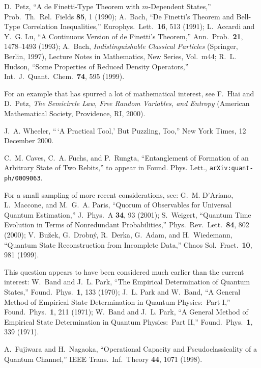 \begin{thebibliography}{10}
D.~Petz, ``A de Finetti-Type Theorem with $m$-Dependent States,''
Prob.\ Th.\ Rel.\ Fields {\bf 85}, 1 (1990); A.~Bach, ``De Finetti's
Theorem and Bell-Type Correlation Inequalities,'' Europhys.\ Lett.\
{\bf 16}, 513 (1991); L.~Accardi and Y.~G. Lu, ``A Continuous Version
of de Finetti's Theorem,'' Ann.\ Prob.\ {\bf 21}, 1478--1493 (1993);
A.~Bach, {\sl Indistinguishable Classical Particles\/} (Springer,
Berlin, 1997), Lecture Notes in Mathematics, New Series, Vol.\ m44;
R.~L. Hudson, ``Some Properties of Reduced Density Operators,'' Int.\
J.\ Quant.\ Chem.\ {\bf 74}, 595 (1999).

For an example that has spurred a lot of mathematical interest, see
F.~Hiai and D.~Petz, {\sl The Semicircle Law, Free Random Variables,
and Entropy\/} (American Mathematical Society, Providence, RI, 2000).

\bibitem{Wheeler2000}
J.~A. Wheeler, ``\,`A Practical Tool,' But Puzzling, Too,'' New York
Times, 12 December 2000.

C.~M. Caves, C.~A. Fuchs, and P.~Rungta, ``Entanglement of Formation
of an Arbitrary State of Two Rebits,'' to appear in Found. Phys. Lett.,
{\tt arXiv:quant-ph/0009063}.

For a small sampling of more recent considerations, see: G.~M.
D'Ariano, L.~Maccone, and M.~G.~A. Paris, ``Quorum of Observables for
Universal Quantum Estimation,'' J.\ Phys.\ A {\bf 34}, 93 (2001);
S.~Weigert, ``Quantum Time Evolution in Terms of Nonredundant
Probabilities,'' Phys.\ Rev.\ Lett.\ {\bf 84}, 802 (2000);
V.~Bu\v{z}ek, G.~Drobn\'y, R.~Derka, G.~Adam, and H.~Wiedemann,
``Quantum State Reconstruction from Incomplete Data,'' Chaos Sol.\
Fract.\ {\bf 10}, 981 (1999).

\bibitem{QuorumOld}
This question appears to have been considered much earlier than
the current interest: W.~Band and J.~L. Park, ``The Empirical
Determination of Quantum States,'' Found.\ Phys.\ {\bf 1}, 133
(1970); J.~L. Park and W.~Band, ``A General Method of Empirical
State Determination in Quantum Physics:\ Part I,'' Found.\ Phys.\
{\bf 1}, 211 (1971); W.~Band and J.~L. Park, ``A General Method of
Empirical State Determination in Quantum Physics:\ Part II,''
Found.\ Phys.\ {\bf 1}, 339 (1971).

\bibitem{Fujiwara1998}
A.~Fujiwara and H.~Nagaoka, ``Operational Capacity and
Pseudoclassicality of a Quantum Channel,'' IEEE Trans.\ Inf.\
Theory {\bf 44}, 1071 (1998).


\end{thebibliography}
